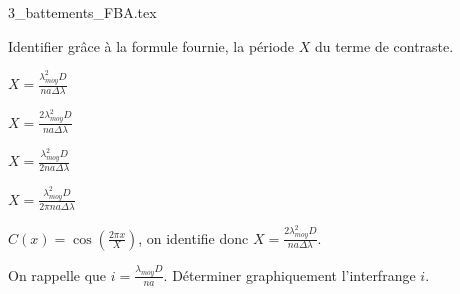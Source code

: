                                 \initialisationPartieDroite %
\begin{center}
	{3_battements_FBA.tex}
\end{center}
                               \finalisationDuPartageDePage %



\debutEntrainement



\begin{enonce}
Identifier grâce à la formule fournie, la période $X$ du terme de contraste.
\begin{listeQCM4Colonnes}
	\item $X=\frac{\lambda_{moy}^2 D}{na\Delta \lambda}$
	\item $X=\frac{2\lambda_{moy}^2 D}{na\Delta \lambda}$
	\item $X=\frac{\lambda_{moy}^2 D}{2na\Delta \lambda}$
	\item $X=\frac{\lambda_{moy}^2 D}{2\pi na\Delta \lambda}$
\end{listeQCM4Colonnes}
\bigskip
\end{enonce}

\reponse{\reponseB{}}

\begin{corrige}
	$C(x)=\cos\left(\frac{2\pi x}{X}\right)$, on identifie donc $X=\frac{2\lambda_{moy}^2 D}{na\Delta \lambda}$.
\end{corrige}




\begin{enonce}
On rappelle que $i=\frac{\lambda_{moy} D}{na}$. Déterminer graphiquement l'interfrange $i$.
\end{enonce}

